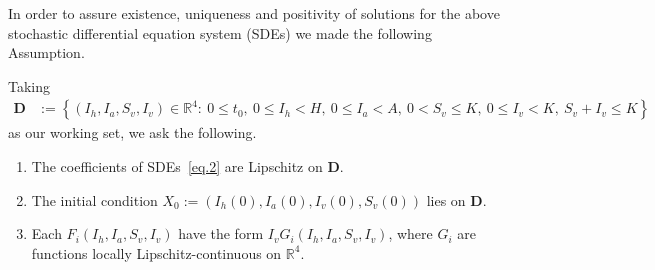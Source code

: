 	In order to assure existence, uniqueness and positivity of solutions for the 
above stochastic differential equation system (SDEs) we made the following
Assumption.
\begin{assumption}\label{ass:regularity}
	Taking %
	\begin{align*}
		\mathbf{D} &:= 
		\left\lbrace 
				\left( 
					I_{h},I_{a},S_{v},I_{v} 
				\right)
				\in 
				\mathbb{R}^{4}:\ 0 \leq t_0, \ 0\leq I_{h} < H,\ 0\leq I_{a} < A,
				\ 0<S_{v}\leq K, \ 0\leq I_{v}< K, \ S_{v}+I_{v} \leq K 
		\right\rbrace
	\end{align*}
	as our working set, we ask the following.
	\begin{enumerate}[({A}-1)]
		\item 
			The coefficients of SDEs~\eqref{eq.2} are Lipschitz on $\mathbf{D}$.
		\item 
			The initial condition $X_0 := (I_h(0), I_a(0), I_v(0), S_v(0))$ lies on
			$\mathbf{D}$.
		\item 
			Each $F_{i}\left(I_{h},I_{a},S_{v},I_{v}\right)$ 
			have the form
			$I_{v}G_{i}\left(I_{h},I_{a},S_{v},I_{v}\right)$, 
		where $G_{i}$ are functions locally Lipschitz-continuous on 
		$\mathbb{R}^{4}$.
	\end{enumerate}
\end{assumption}